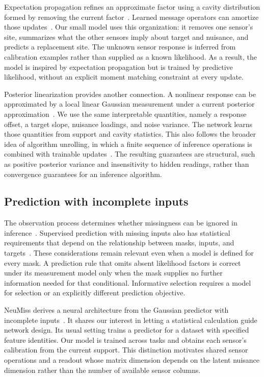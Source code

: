 Expectation propagation refines an approximate factor using a cavity distribution formed by removing the current factor~\citep{minka2001ep}. Learned message operators can amortize those updates~\citep{heess2013learning,eslami2014just,jitkrittum2015kernel}. Our small model uses this organization: it removes one sensor's site, summarizes what the other sensors imply about target and nuisance, and predicts a replacement site. The unknown sensor response is inferred from calibration examples rather than supplied as a known likelihood. As a result, the model is inspired by expectation propagation but is trained by predictive likelihood, without an explicit moment matching constraint at every update.

Posterior linearization provides another connection. A nonlinear response can be approximated by a local linear Gaussian measurement under a current posterior approximation~\citep{deisenroth2012ep,garciafernandez2015plf}. We use the same interpretable quantities, namely a response offset, a target slope, nuisance loadings, and noise variance. The network learns those quantities from support and cavity statistics. This also follows the broader idea of algorithm unrolling, in which a finite sequence of inference operations is combined with trainable updates~\citep{gregor2010lista,monga2021unrolling}. The resulting guarantees are structural, such as positive posterior variance and insensitivity to hidden readings, rather than convergence guarantees for an inference algorithm.

\subsection{Prediction with incomplete inputs}

The observation process determines whether missingness can be ignored in inference~\citep{rubin1976inference,little2019statistical}. Supervised prediction with missing inputs also has statistical requirements that depend on the relationship between masks, inputs, and targets~\citep{josse2019consistency}. These considerations remain relevant even when a model is defined for every mask. A prediction rule that omits absent likelihood factors is correct under its measurement model only when the mask supplies no further information needed for that conditional. Informative selection requires a model for selection or an explicitly different prediction objective.

NeuMiss derives a neural architecture from the Gaussian predictor with incomplete inputs~\citep{lemorvan2020neumiss}. It shares our interest in letting a statistical calculation guide network design. Its usual setting trains a predictor for a dataset with specified feature identities. Our model is trained across tasks and obtains each sensor's calibration from the current support. This distinction motivates shared sensor operations and a readout whose matrix dimension depends on the latent nuisance dimension rather than the number of available sensor columns.

